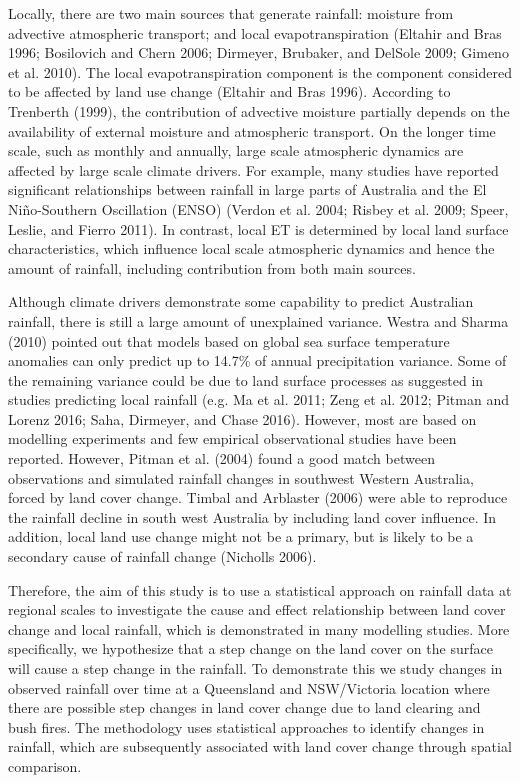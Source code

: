 \documentclass[fleqn,10pt,lineno]{wlpeerj} %
\begin{document}
Locally, there are two main sources that generate rainfall: moisture
from advective atmospheric transport; and local evapotranspiration
(Eltahir and Bras 1996; Bosilovich and Chern 2006; Dirmeyer, Brubaker,
and DelSole 2009; Gimeno et al. 2010). The local evapotranspiration
component is the component considered to be affected by land use change
(Eltahir and Bras 1996). According to Trenberth (1999), the contribution
of advective moisture partially depends on the availability of external
moisture and atmospheric transport. On the longer time scale, such as
monthly and annually, large scale atmospheric dynamics are affected by
large scale climate drivers. For example, many studies have reported
significant relationships between rainfall in large parts of Australia
and the El Niño-Southern Oscillation (ENSO) (Verdon et al. 2004; Risbey
et al. 2009; Speer, Leslie, and Fierro 2011). In contrast, local ET is
determined by local land surface characteristics, which influence local
scale atmospheric dynamics and hence the amount of rainfall, including
contribution from both main sources.

Although climate drivers demonstrate some capability to predict
Australian rainfall, there is still a large amount of unexplained
variance. Westra and Sharma (2010) pointed out that models based on
global sea surface temperature anomalies can only predict up to 14.7\%
of annual precipitation variance. Some of the remaining variance could
be due to land surface processes as suggested in studies predicting
local rainfall (e.g. Ma et al. 2011; Zeng et al. 2012; Pitman and Lorenz
2016; Saha, Dirmeyer, and Chase 2016). However, most are based on
modelling experiments and few empirical observational studies have been
reported. However, Pitman et al. (2004) found a good match between
observations and simulated rainfall changes in southwest Western
Australia, forced by land cover change. Timbal and Arblaster (2006) were
able to reproduce the rainfall decline in south west Australia by
including land cover influence. In addition, local land use change might
not be a primary, but is likely to be a secondary cause of rainfall
change (Nicholls 2006).

Therefore, the aim of this study is to use a statistical approach on
rainfall data at regional scales to investigate the cause and effect
relationship between land cover change and local rainfall, which is
demonstrated in many modelling studies. More specifically, we
hypothesize that a step change on the land cover on the surface will
cause a step change in the rainfall. To demonstrate this we study
changes in observed rainfall over time at a Queensland and NSW/Victoria
location where there are possible step changes in land cover change due
to land clearing and bush fires. The methodology uses statistical
approaches to identify changes in rainfall, which are subsequently
associated with land cover change through spatial comparison.
\end{document}
